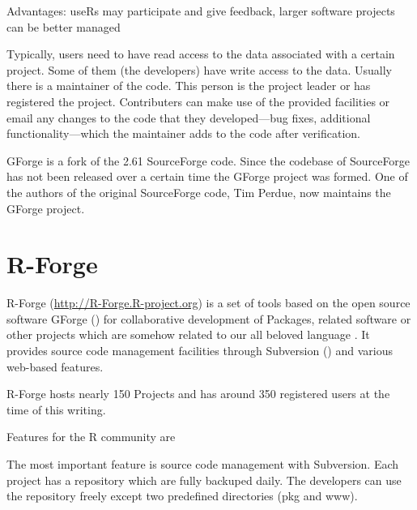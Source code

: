 Advantages: useRs may participate and give feedback, larger software
projects can be better managed 

Typically, users need to have read access to the data associated with
a certain project. Some of them (the developers) have write access to
the data. Usually there is a maintainer of the code. This person is the project
leader or has registered the project. Contributers can make use of the
provided facilities or email any changes to the code
that they developed---bug fixes, additional functionality---which the
maintainer adds to the code after verification.


GForge is a fork of the 2.61 SourceForge code. Since the codebase of
SourceForge has not been released over a certain time the GForge
project was formed. One of the authors of the original SourceForge
code, Tim Perdue, now maintains the GForge project.


\section*{R-Forge}
R-Forge (\url{http://R-Forge.R-project.org}) is a set of tools based
on the open source software GForge (\cite{manual:gforge})%
 for collaborative development of  Packages, 
related software or other projects which are somehow related to our
all beloved language . It provides source code management facilities
through Subversion (\cite{subversion07}) and various web-based features. 

R-Forge hosts nearly 150 Projects and has around 350 registered users at the
time of this writing.





Features for the R community are 

The most important feature is source code management with
Subversion. Each project has a repository which are fully backuped
daily. The developers can use the repository
freely except two predefined directories (pkg and www). %

